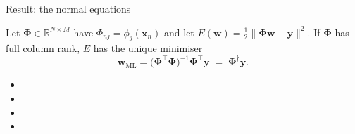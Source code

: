 \documentclass[aspectratio=169, 11pt]{beamer}
\newcommand{\src}[3]{}      %
\begin{document}
\begin{frame}{Result: the normal equations}
  \src{bishop2024}{equation}{4.12-4.16}
  \src{bishop2024}{section}{4.1.3}
  \begin{theorem}
    Let $\boldsymbol{\Phi}\in\mathbb{R}^{N\times M}$ have
    $\Phi_{nj}=\phi_j(\mathbf{x}_n)$ and let
    $E(\mathbf{w})=\tfrac12\lVert\boldsymbol{\Phi}\mathbf{w}
    -\mathbf{y}\rVert^2$.
    If $\boldsymbol{\Phi}$ has full column rank, $E$ has the unique
    minimiser
    \[
      \mathbf{w}_{\mathrm{ML}}
      = \big(\boldsymbol{\Phi}^{\!\top}\boldsymbol{\Phi}\big)^{-1}
        \boldsymbol{\Phi}^{\!\top}\mathbf{y}
      \;=\;\boldsymbol{\Phi}^{\dagger}\mathbf{y}.
      \tag{B\&B 4.14}
    \]
  \end{theorem}
  \vspace{0.2em}
  {\footnotesize
  \begin{itemize}\setlength{\itemsep}{1pt}
    \item {}
    \item {}
    \item {}
    \item {}
  \end{itemize}}
\end{frame}
\end{document}
